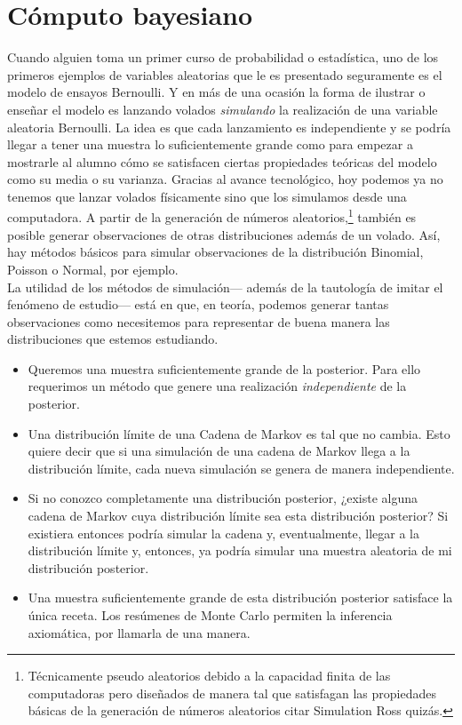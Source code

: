 \chapter{Cómputo bayesiano}

Cuando alguien toma un primer curso de probabilidad o estadística, uno de los primeros ejemplos de variables aleatorias que le es presentado seguramente es el modelo de ensayos Bernoulli. Y en más de una ocasión la forma de ilustrar o enseñar el modelo es lanzando volados \textit{simulando} la realización de una variable aleatoria Bernoulli. La idea es que cada lanzamiento es independiente y se podría llegar a tener una muestra lo suficientemente grande como para empezar a mostrarle al alumno cómo se satisfacen ciertas propiedades teóricas del modelo como su media o su varianza. Gracias al avance tecnológico, hoy podemos ya no tenemos que lanzar volados físicamente sino que los simulamos desde una computadora. A partir de la generación de números aleatorios,\footnote{Técnicamente pseudo aleatorios debido a la capacidad finita de las computadoras pero diseñados de manera tal que satisfagan las propiedades básicas de la generación de números aleatorios {\color{Red} citar Simulation Ross quizás}.} también es posible generar observaciones de otras distribuciones además de un volado. Así, hay métodos básicos para simular observaciones de la distribución Binomial, Poisson o Normal, por ejemplo.\\

La utilidad de los métodos de simulación--- además de la tautología de imitar el fenómeno de estudio--- está en que, en teoría, podemos generar tantas observaciones como necesitemos para representar de buena manera las distribuciones que estemos estudiando.\\ 

\begin{itemize}
\item Queremos una muestra suficientemente grande de la posterior. Para ello requerimos un método que genere una realización \textit{independiente} de la posterior. 

\item Una distribución límite de una Cadena de Markov es tal que no cambia. Esto quiere decir que si una simulación de una cadena de Markov llega a la distribución límite, cada nueva simulación se genera de manera independiente. 

\item Si no conozco completamente una distribución posterior, ¿existe alguna cadena de Markov cuya distribución límite sea esta distribución posterior? Si existiera entonces podría simular la cadena y, eventualmente, llegar a la distribución límite y, entonces, ya podría simular una muestra aleatoria de mi distribución posterior.

\item Una muestra suficientemente grande de esta distribución posterior satisface la única receta. Los resúmenes de Monte Carlo permiten la inferencia axiomática, por llamarla de una manera.  
\end{itemize}





